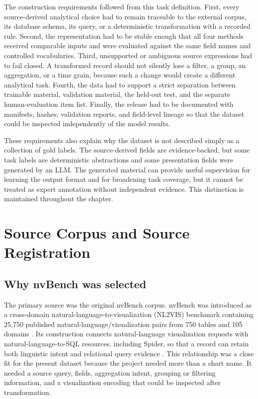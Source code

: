 The construction requirements followed from this task definition. First, every source-derived analytical choice had to remain traceable to the external corpus, its database schema, its query, or a deterministic transformation with a recorded rule. Second, the representation had to be stable enough that all four methods received comparable inputs and were evaluated against the same field names and controlled vocabularies. Third, unsupported or ambiguous source expressions had to fail closed. A transformed record should not silently lose a filter, a group, an aggregation, or a time grain, because such a change would create a different analytical task. Fourth, the data had to support a strict separation between trainable material, validation material, the held-out test, and the separate human-evaluation item list. Finally, the release had to be documented with manifests, hashes, validation reports, and field-level lineage so that the dataset could be inspected independently of the model results.

These requirements also explain why the dataset is not described simply as a collection of gold labels. The source-derived fields are evidence-backed, but some task labels are deterministic abstractions and some presentation fields were generated by an LLM. The generated material can provide useful supervision for learning the output format and for broadening task coverage, but it cannot be treated as expert annotation without independent evidence. This distinction is maintained throughout the chapter.

\section{Source Corpus and Source Registration}

\subsection{Why nvBench was selected}

The primary source was the original nvBench corpus. nvBench was introduced as a cross-domain natural-language-to-visualization (NL2VIS) benchmark containing 25,750 published natural-language/visualization pairs from 750 tables and 105 domains \cite{luo2021nvbenchdataset}. Its construction connects natural-language visualization requests with natural-language-to-SQL resources, including Spider, so that a record can retain both linguistic intent and relational query evidence \cite{luo2021nvbenchsigmod,yu2018spider}. This relationship was a close fit for the present dataset because the project needed more than a chart name. It needed a source query, fields, aggregation intent, grouping or filtering information, and a visualization encoding that could be inspected after transformation.

